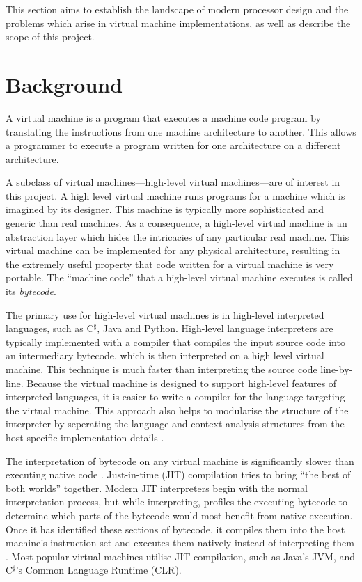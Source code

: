 	This section aims to establish the landscape of modern processor design and the problems which arise in virtual machine implementations, as well as describe the scope of this project.
	
	\section{Background}
		A virtual machine is a program that executes a machine code program by translating the instructions from one machine architecture to another. This allows a programmer to execute a program written for one architecture on a different architecture.
		
		A subclass of virtual machines---high-level virtual machines---are of interest in this project. A high level virtual machine runs programs for a machine which is imagined by its designer. This machine is typically more sophisticated and generic than real machines. As a consequence, a high-level virtual machine is an abstraction layer which hides the intricacies of any particular real machine. This virtual machine can be implemented for any physical architecture, resulting in the extremely useful property that code written for a virtual machine is very portable. The ``machine code'' that a high-level virtual machine executes is called its \emph{bytecode}. 
		
		The primary use for high-level virtual machines is in high-level interpreted languages, such as C$^\sharp$, Java and Python. High-level language interpreters are typically implemented with a compiler that compiles the input source code into an intermediary bytecode, which is then interpreted on a high level virtual machine. This technique is much faster than interpreting the source code line-by-line. Because the virtual machine is designed to support high-level features of interpreted languages, it is easier to write a compiler for the language targeting the virtual machine. This approach also helps to modularise the structure of the interpreter by seperating the language and context analysis structures from the host-specific implementation details \citep{structureinterpreters}.
		
		The interpretation of bytecode on any virtual machine is significantly slower than executing native code \citep{optimizingindirectbranch}. Just-in-time (JIT) compilation tries to bring ``the best of both worlds'' together. Modern JIT interpreters begin with the normal interpretation process, but while interpreting, profiles the executing bytecode to determine which parts of the bytecode would most benefit from native execution. Once it has identified these sections of bytecode, it compiles them into the host machine's instruction set and executes them natively instead of interpreting them \citep{historyjit}. Most popular virtual machines utilise JIT compilation, such as Java's JVM, and C$^\sharp$'s Common Language Runtime (CLR).
		
